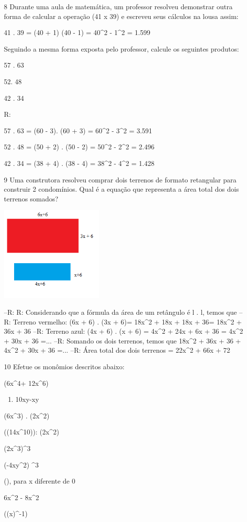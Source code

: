 {\num{8} Durante uma aula de matemática, um professor resolveu demonstrar
outra forma de calcular a operação (41 x 39) e escreveu seus cálculos na
lousa assim:

41 . 39 = (40 + 1) (40 - 1) = 40^2 - 1^2 = 1.599

Seguindo a mesma forma exposta pelo professor, calcule os seguintes
produtos:
\item 57 . 63
\item 52. 48
\item 42 . 34

R:
\item 57 . 63 = (60 - 3). (60 + 3) = 60^2 - 3^2 = 3.591
\item 52 . 48 = (50 + 2) . (50 - 2) = 50^2 - 2^2 = 2.496
\item 42 . 34 = (38 + 4) . (38 - 4) = 38^2 - 4^2 = 1.428

\num{9} Uma construtora resolveu comprar dois terrenos de formato retangular
para construir 2 condomínios. Qual é a equação que representa a área
total dos dois terrenos somados?

\includegraphics[width=2.04167in,height=1.8873in]{./imgSAEB_8_MAT/media/image5.png}

--R: R: Considerando que a fórmula da área de um retângulo é l . l, temos que
--R: Terreno vermelho: (6x + 6) . (3x + 6)= 18x^2 + 18x + 18x + 36= 18x^2 + 36x + 36
--R: Terreno azul: (4x + 6) . (x + 6) = 4x^2 + 24x + 6x + 36 = 4x^2 + 30x + 36 =...
--R: Somando os dois terrenos, temos que 18x^2 + 36x + 36 + 4x^2 + 30x + 36 =...
--R: Área total dos dois terrenos = 22x^2 + 66x + 72

\num{10} Efetue os monômios descritos abaixo:
\item (6x^4+ 12x^6)

\begin{enumerate}
\def\labelenumi{\alph{enumi})}
\setcounter{enumi}{1}
\tightlist
\item
  10xy-xy
\end{enumerate}
\item(6x^3) . (2x^2)
\item ((14x^{10})): (2x^2)
\item (2x^3)^3
\item (-4xy^2) ^3
\item (), para x diferente de 0
\item 6x^2 - 8x^2
\item((x)^{-1})

}
